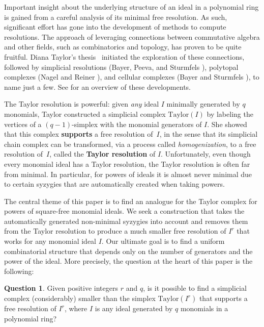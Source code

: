 \documentclass[11pt]{article}
\theoremstyle{definition}
\newtheorem{question}[theo]{Question}
\numberwithin{equation}{section}
\newcommand{\Taylor}{\mathrm{Taylor}}
\begin{document}
Important insight about the underlying structure of an ideal in a
polynomial ring is gained from a careful analysis of its minimal free
resolution.  As such, significant effort has gone into the development
of methods to compute resolutions.  The approach of leveraging
connections between commutative algebra and other fields, such as
combinatorics and topology, has proven to be quite fruitful.  Diana
Taylor's thesis~\cite{T} initiated the exploration of these
connections, followed by simplicial resolutions (Bayer, Peeva, and
Sturmfels \cite{BPS}), polytopal complexes (Nagel and Reiner
\cite{NR}), and cellular complexes (Bayer and Sturmfels \cite{BS}), to
name just a few. See \cite{MS,OW} for an overview of these developments.

The Taylor resolution is powerful: given \textit{any} ideal $I$
minimally generated by $q$ monomials, Taylor constructed a simplicial
complex $\Taylor(I)$ by labeling the vertices of a $(q-1)$-simplex with
the monomial generators of $I$. She showed that this complex {\bf
  supports} a free resolution of~$I$, in the sense that its simplicial
chain complex can be transformed, via a process called {\it
  homogenization}, to a free resolution of~$I$, called the {\bf Taylor
  resolution} of $I$.
Unfortunately, even though every monomial ideal has a Taylor
resolution, the Taylor resolution is often far from minimal.  In
particular, for powers of ideals it is almost never minimal due to certain syzygies that are automatically created when taking powers.

The central theme of this paper is to find an analogue for the Taylor
complex for powers of square-free monomial ideals.
We seek a construction that takes the automatically generated non-minimal syzygies 
into account and removes them from the Taylor resolution to produce a
much smaller free resolution of $I^r$ that works for any monomial ideal $I$. Our
ultimate goal is to find a uniform combinatorial structure that
depends only on the number of generators and the power of the ideal.
More precisely, the question at the heart of this paper is the
following:

\begin{question} Given positive integers $r$ and $q$, is it possible to
  find a simplicial complex \textup{(}considerably\textup{)} smaller than the simplex
  $\Taylor(I^r)$ that supports a free resolution of $I^r$, where $I$
  is any ideal generated by $q$ monomials in a polynomial ring?
\end{question}
\end{document}
